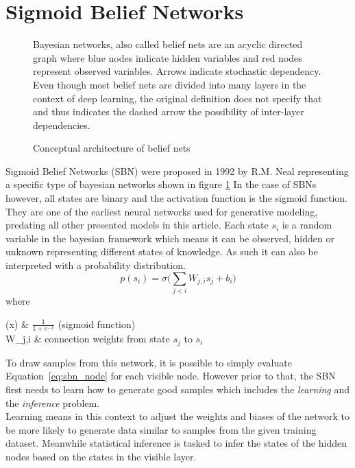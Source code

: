 \section{Sigmoid Belief Networks}
\label{sec:sbn}
\begin{figure}[htb]
\centering

  \caption[Architecture of Sigmoid Belief Nets]{Conceptual architecture of belief nets}
  \label{fig:sbn_arch}
  \medskip
  \small
  Bayesian networks, also called belief nets are an acyclic directed graph where blue nodes indicate hidden variables and red nodes represent observed variables.
  Arrows indicate stochastic dependency.
  Even though most belief nets are divided into many layers in the context of deep learning, the original definition does not specify that and thus indicates the dashed arrow the possibility of inter-layer dependencies.
\end{figure}

Sigmoid Belief Networks (SBN) were proposed in 1992 by R.M. Neal \cite{neal:1992} representing a specific type of bayesian networks \cite{pearl:1985} shown in figure \ref{fig:sbn_arch}
In the case of SBNs however, all states are binary and the activation function is the sigmoid function. They are one of the earliest neural networks used for generative modeling, predating all other presented models in this article.
Each state $s_i$ is a random variable in the bayesian framework which means it can be observed, hidden or unknown representing different states of knowledge. As such it can also be interpreted with a probability distribution.
\begin{equation}
  \label{eq:sbn_node}
p(s_i) = \sigma\bigg(\sum_{j<i}W_{j,i}s_j+b_i\bigg)
\end{equation}
where 
\begin{conditions}
  \sigma(x) & $\frac{1}{1 + e^{-x}}$ (sigmoid function)\\
  W_{j,i} & connection weights from state $s_j$ to $s_i$\\
\end{conditions}

To draw samples from this network, it is possible to simply evaluate Equation~\ref{eq:sbn_node} for each visible node.
However prior to that, the SBN first needs to learn how to generate good samples which includes the \emph{learning} and the \emph{inference} problem.\\
Learning means in this context to adjust the weights and biases of the network to be more likely to generate data similar to samples from the given training dataset.
Meanwhile statistical inference is tasked to infer the states of the hidden nodes based on the states in the visible layer.\\

